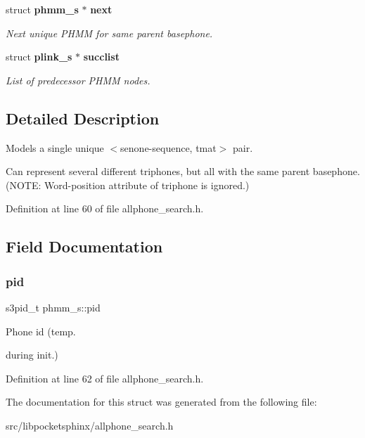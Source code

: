 \begin{DoxyCompactItemize}
struct \textbf{ phmm\+\_\+s} $\ast$ \textbf{ next}
\begin{DoxyCompactList}\small\item\em Next unique P\+H\+MM for same parent basephone. \end{DoxyCompactList}\item 
\mbox{\label{structphmm__s_a152d26f99b39098c8027cd2d8372e05c}} 
struct \textbf{ plink\+\_\+s} $\ast$ \textbf{ succlist}
\begin{DoxyCompactList}\small\item\em List of predecessor P\+H\+MM nodes. \end{DoxyCompactList}\end{DoxyCompactItemize}


\subsection{Detailed Description}
Models a single unique $<$senone-\/sequence, tmat$>$ pair. 

Can represent several different triphones, but all with the same parent basephone. (N\+O\+TE\+: Word-\/position attribute of triphone is ignored.) 

Definition at line 60 of file allphone\+\_\+search.\+h.



\subsection{Field Documentation}
\mbox{\label{structphmm__s_aee52956004053c676230cd8567366b60}} 
\subsubsection{pid}
{\footnotesize\ttfamily s3pid\+\_\+t phmm\+\_\+s\+::pid}



Phone id (temp. 

during init.) 

Definition at line 62 of file allphone\+\_\+search.\+h.



The documentation for this struct was generated from the following file\+:\begin{DoxyCompactItemize}
\item 
src/libpocketsphinx/allphone\+\_\+search.\+h\end{DoxyCompactItemize}
